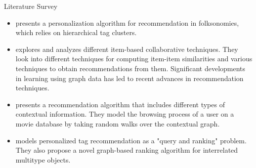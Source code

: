 \documentclass{report}
\begin{document}
\begin{projChapter}{Literature Survey}
\begin{itemize}
  \item  {}\rbrack presents a personalization algorithm for recommendation in folksonomies, which relies on hierarchical tag clusters.
  \item  {}\rbrack explores and analyzes different item-based collaborative techniques. They look into different techniques for computing item-item similarities and various techniques to obtain recommendations from them. Significant developments in learning using graph data has led to recent advances in recommendation techniques.
  \item  {}\rbrack presents a recommendation algorithm that includes different types of contextual information. They model the browsing process of a user on a movie database by taking random walks over the contextual graph.
  \item  {}\rbrack models personalized tag recommendation as a "query and ranking" problem. They also propose a novel graph-based ranking algorithm for interrelated multitype objects.
\end{itemize}
\end{projChapter}
\end{document}
